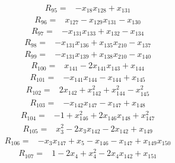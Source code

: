 \[
\begin{aligned}
R_{95}={}&-x_{18}x_{128}+x_{131}
\end{aligned}
\]
\[
\begin{aligned}
R_{96}={}&x_{127}-x_{129}x_{131}-x_{130}
\end{aligned}
\]
\[
\begin{aligned}
R_{97}={}&-x_{131}x_{133}+x_{132}-x_{134}
\end{aligned}
\]
\[
\begin{aligned}
R_{98}={}&-x_{131}x_{136}+x_{135}x_{210}-x_{137}
\end{aligned}
\]
\[
\begin{aligned}
R_{99}={}&-x_{131}x_{139}+x_{138}x_{210}-x_{140}
\end{aligned}
\]
\[
\begin{aligned}
R_{100}={}&x_{141}-2x_{141}x_{143}+x_{144}
\end{aligned}
\]
\[
\begin{aligned}
R_{101}={}&-x_{141}x_{144}-x_{144}+x_{145}
\end{aligned}
\]
\[
\begin{aligned}
R_{102}={}&2x_{142}+x_{142}^{2}+x_{144}^{2}-x_{145}^{2}
\end{aligned}
\]
\[
\begin{aligned}
R_{103}={}&-x_{142}x_{147}-x_{147}+x_{148}
\end{aligned}
\]
\[
\begin{aligned}
R_{104}={}&-1+x_{146}^{2}+2x_{146}x_{148}+x_{147}^{2}
\end{aligned}
\]
\[
\begin{aligned}
R_{105}={}&x_{3}^{2}-2x_{3}x_{142}-2x_{142}+x_{149}
\end{aligned}
\]
\[
\begin{aligned}
R_{106}={}&-x_{3}x_{147}+x_{5}-x_{146}-x_{147}+x_{149}x_{150}
\end{aligned}
\]
\[
\begin{aligned}
R_{107}={}&1-2x_{4}+x_{4}^{2}-2x_{4}x_{142}+x_{151}
\end{aligned}
\]
